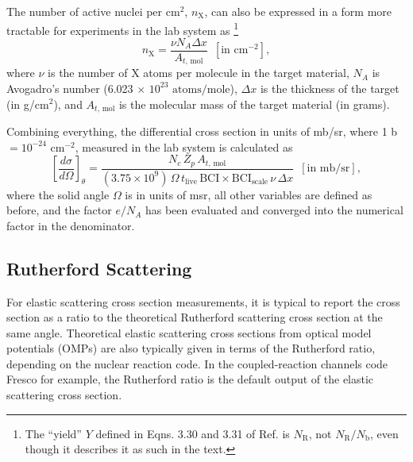 The number of active nuclei per $\mathrm{cm}^{2}$, $n_{\mathrm{X}}$, can also be expressed in a form more tractable for experiments in the lab system as \cite{Rolfs1988,SetoodehniaThesis}\footnote{The ``yield'' $Y$ defined in Eqns. 3.30 and 3.31 of Ref. \cite{SetoodehniaThesis} is $N_{\mathrm{R}}$, not $N_{\mathrm{R}}/N_{\mathrm{b}}$, even though it describes it as such in the text.}
\begin{equation}
n_{\mathrm{X}} = \frac{\nu N_{A} \Delta x}{A_{t, \, \mathrm{mol}}} \,\,\, [\mathrm{in \,\, cm}^{-2}],
\end{equation}
where $\nu$ is the number of $\mathrm{X}$ atoms per molecule in the target material, $N_{A}$ is Avogadro's number (6.023 $\times$ $10^{23}$ $\mathrm{atoms}/\mathrm{mole}$), $\Delta x$ is the thickness of the target (in g/$\mathrm{cm}^{2}$), and $A_{t, \, \mathrm{mol}}$ is the molecular mass of the target material (in grams).

Combining everything, the differential cross section in units of mb/sr, where 1 b $ = 10^{-24}$ $\mathrm{cm}^{-2}$, measured in the lab system is calculated as
\begin{equation}
\left[ \frac{d\sigma}{d\Omega} \right]_{\theta} = \frac{N_{c} \, Z_{p} \, A_{t, \, \mathrm{mol}}}{(3.75 \times 10^{9}) \, \Omega \, t_{\mathrm{live}} \, \mathrm{BCI} \times \mathrm{BCI}_{\mathrm{scale}} \, \nu \, \Delta x} \, \, \, [\mathrm{in} \, \, \mathrm{mb}/\mathrm{sr}],
\end{equation}
where the solid angle $\Omega$ is in units of msr, all other variables are defined as before, and the factor $e/N_{A}$ has been evaluated and converged into the numerical factor in the denominator.

\subsection{Rutherford Scattering} \label{subsec:Ruth}

For elastic scattering cross section measurements, it is typical to report the cross section as a ratio to the theoretical Rutherford scattering cross section at the same angle. Theoretical elastic scattering cross sections from optical model potentials (OMPs) are also typically given in terms of the Rutherford ratio, depending on the nuclear reaction code. In the coupled-reaction channels code Fresco \cite{Fresco} for example, the Rutherford ratio is the default output of the elastic scattering cross section. 

